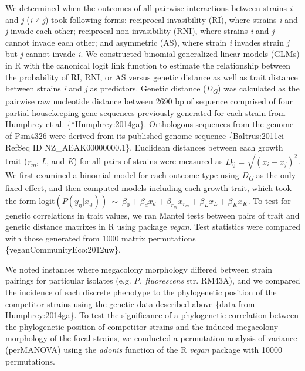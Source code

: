 We determined when the outcomes of all pairwise interactions between
strains \emph{i} and \emph{j} (\emph{i ≠ j}) took following forms:
reciprocal invasibility (RI), where strains \emph{i} and \emph{j} invade
each other; reciprocal non-invasibility (RNI), where strains \emph{i}
and \emph{j} cannot invade each other; and asymmetric (AS), where strain
\emph{i} invades strain \emph{j} but \emph{j} cannot invade \emph{i}. We
constructed binomial generalized linear models (GLMs) in R with the
canonical logit link function to estimate the relationship between the
probability of RI, RNI, or AS versus genetic distance as well as trait
distance between strains \emph{i} and \emph{j} as predictors. Genetic
distance (\emph{D\textsubscript{G}}) was calculated as the pairwise raw
nucleotide distance between 2690 bp of sequence comprised of four
partial housekeeping gene sequences previously generated for each strain
from Humphrey et al. \{*Humphrey:2014ga\}. Orthologous sequences from
the genome of Psm4326 were derived from its published genome sequence
\{Baltrus:2011ci RefSeq ID NZ\_AEAK00000000.1\}. Euclidean distances
between each growth trait (\emph{r\textsubscript{m}}, \emph{L}, and
\emph{K}) for all pairs of strains were measured as
\(D_{\text{ij}} = \sqrt{{(x_{i} - x_{j})}^{2}}\). We first examined a
binomial model for each outcome type using \emph{D\textsubscript{G}} as
the only fixed effect, and then computed models including each growth
trait, which took the form
\(\text{logit}\left( P(y_{\text{ij}}|x_{\text{ij}}) \right)\ \sim\ \beta_{0} + \beta_{d}x_{d} + \beta_{r_{m}}x_{r_{m}} + \beta_{L}x_{L} + \beta_{K}x_{K}\).
To test for genetic correlations in trait values, we ran Mantel tests
between pairs of trait and genetic distance matrixes in R using package
\emph{vegan}. Test statistics were compared with those generated from
1000 matrix permutations \{veganCommunityEco:2012uw\}.

We noted instances where megacolony morphology differed between strain
pairings for particular isolates (e.g. \emph{P. fluorescens} str.
RM43A), and we compared the incidence of each discrete phenotype to the
phylogenetic position of the competitor strains using the genetic data
described above \{data from Humphrey:2014ga\}. To test the significance
of a phylogenetic correlation between the phylogenetic position of
competitor strains and the induced megacolony morphology of the focal
strains, we conducted a permutation analysis of variance (perMANOVA)
using the \emph{adonis} function of the R \emph{vegan} package with
10000 permutations.

